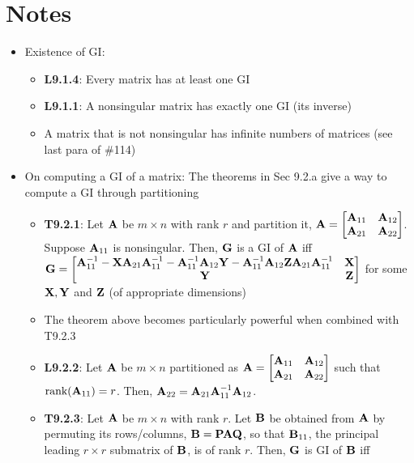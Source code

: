 \documentclass[a4paper, oneside]{book}
\begin{document}
\section*{Notes}
\begin{itemize}
\item Existence of GI:
	\begin{itemize}
	\item \textbf{L9.1.4}: Every matrix has at least one GI
	\item \textbf{L9.1.1}: A nonsingular matrix has exactly one GI (\ie its inverse)
	\item A matrix that is not nonsingular has infinite numbers of matrices (see last para of \#114)
	\end{itemize}
\item On computing a GI of a matrix: The theorems in Sec 9.2.a give a way to compute a GI through partitioning
\begin{itemize}
	\item \textbf{T9.2.1}: Let $\mathbf A$ be $m\times n$ with rank $r$ and partition it, $\mathbf A=\begin{bmatrix} \mathbf A_{11} & \mathbf A_{12} \\ \mathbf A_{21} & \mathbf A_{22} \end{bmatrix}$. Suppose $\mathbf A_{11}$ is nonsingular. Then, $\mathbf G$ is a GI of $\mathbf A$ iff 
	$\mathbf{G}=\begin{bmatrix}
	\mathbf A^{-1}_{11}-\mathbf{X}\mathbf A_{21} \mathbf A^{-1}_{11}-\mathbf A^{-1}_{11} \mathbf A_{12} \mathbf Y - \mathbf A^{-1}_{11} \mathbf A_{12} \mathbf{ZA}_{21}\mathbf A^{-1}_{11} & \mathbf X \\
	\mathbf Y & \mathbf Z
	\end{bmatrix}$ for some $\mathbf{X, Y}$ and $\mathbf Z$ (of appropriate dimensions)
	\item The theorem above becomes particularly powerful when combined with T9.2.3
	\item \textbf{L9.2.2}: Let $\mathbf{A}$ be $m\times n$ partitioned as $\mathbf{A} = \begin{bmatrix} \mathbf{A}_{11} & \mathbf A_{12} \\ \mathbf{A}_{21} & \mathbf{A}_{22} \end{bmatrix}$ such that $\text{rank}(\mathbf{A}_{11})=r$. Then, $\mathbf{A}_{22}=\mathbf{A}_{21}\mathbf{A}_{11}^{-1}\mathbf{A}_{12}$.
	\item \textbf{T9.2.3}: Let $\mathbf A$ be $m\times n$ with rank $r$. Let $\mathbf B$ be obtained from $\mathbf A$ by permuting its rows/columns, \ie $\mathbf{B=PAQ}$, so that $\mathbf{B}_{11}$, the principal leading $r\times r$ submatrix of $\mathbf{B}$, is of rank $r$. Then, $\mathbf G$ is GI of $\mathbf B$ iff 

\end{itemize}
\end{itemize}
\end{document}
